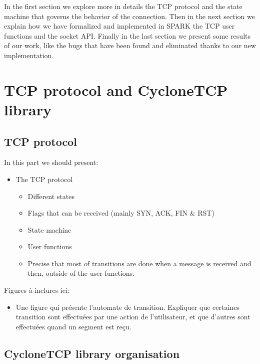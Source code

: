 \documentclass[runningheads]{llncs}
\begin{document}
    In the first section we explore more in details the TCP protocol and the state machine that governs the behavior of the connection.
    Then in the next section we explain how we have formalized and implemented in SPARK the TCP user functions and the socket API.
    Finally in the last section we present some results of our work, like the bugs that have been found and eliminated thanks to our
    new implementation.


\section{TCP protocol and CycloneTCP library}
\label{sec:TCP}

\subsection{TCP protocol}


In this part we should present:
\begin{itemize}
    \item The TCP protocol
    \begin{itemize}
        \item Different states
        \item Flags that can be received (mainly SYN, ACK, FIN \& RST)
        \item State machine
        \item User functions
        \item Precise that most of transitions are done when a message is received and then, outside of the user functions.
    \end{itemize}
\end{itemize}


Figures à inclures ici:
\begin{itemize}
    \item Une figure qui présente l'automate de transition. Expliquer que certaines transition sont effectuées par une action de l'utilisateur,
          et que d'autres sont effectuées quand un segment est reçu.
\end{itemize}


\subsection{CycloneTCP library organisation}

    
\end{document}
